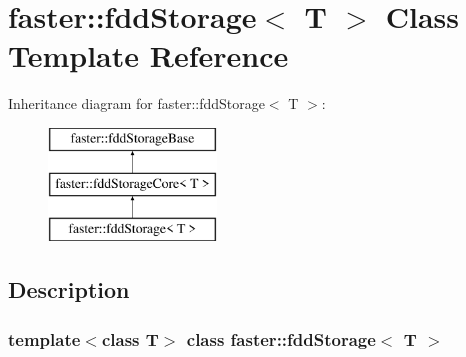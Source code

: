 \hypertarget{classfaster_1_1fddStorage}{}\section{faster\+:\+:fdd\+Storage$<$ T $>$ Class Template Reference}
\label{classfaster_1_1fddStorage}
Inheritance diagram for faster\+:\+:fdd\+Storage$<$ T $>$\+:\begin{figure}[H]
\begin{center}
\leavevmode
\includegraphics[height=3.000000cm]{classfaster_1_1fddStorage}
\end{center}
\end{figure}


\subsection{Description}
\subsubsection*{template$<$class T$>$\newline
class faster\+::fdd\+Storage$<$ T $>$}

